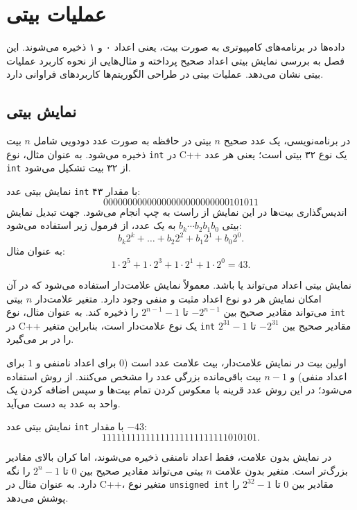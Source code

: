 \chapter{عملیات بیتی}

داده‌ها در برنامه‌های کامپیوتری به صورت بیت، یعنی اعداد ۰ و ۱ ذخیره می‌شوند.
این فصل به بررسی نمایش بیتی اعداد صحیح پرداخته و مثال‌هایی از نحوه کاربرد عملیات بیتی نشان می‌دهد.
عملیات بیتی در طراحی الگوریتم‌ها کاربردهای فراوانی دارد.

\section{نمایش بیتی}


در برنامه‌نویسی، یک عدد صحیح $n$ بیتی در حافظه به صورت عدد دودویی شامل $n$ بیت ذخیره می‌شود.
به عنوان مثال، نوع \texttt{int} در C++ یک نوع ۳۲ بیتی است؛ یعنی هر عدد \texttt{int} از ۳۲ بیت تشکیل می‌شود.

نمایش بیتی عدد \texttt{int} با مقدار ۴۳:
\[00000000000000000000000000101011\]
اندیس‌گذاری بیت‌ها در این نمایش از راست به چپ انجام می‌شود.
جهت تبدیل نمایش بیتی $b_k \cdots b_2 b_1 b_0$ به یک عدد، از فرمول زیر استفاده می‌شود:
\[b_k 2^k + \ldots + b_2 2^2 + b_1 2^1 + b_0 2^0.\]
به عنوان مثال:
\[1 \cdot 2^5 + 1 \cdot 2^3 + 1 \cdot 2^1 + 1 \cdot 2^0 = 43.\]

نمایش بیتی اعداد می‌تواند  یا  باشد.
معمولاً نمایش علامت‌دار استفاده می‌شود که در آن امکان نمایش هر دو نوع اعداد مثبت و منفی وجود دارد.
متغیر علامت‌دار $n$ بیتی می‌تواند مقادیر صحیح بین $-2^{n-1}$ تا $2^{n-1}-1$ را ذخیره کند.
به عنوان مثال، نوع \texttt{int} در C++ یک نوع علامت‌دار است، بنابراین متغیر \texttt{int} مقادیر صحیح بین $-2^{31}$ تا $2^{31}-1$ را در بر می‌گیرد.

اولین بیت در نمایش علامت‌دار، بیت علامت عدد است ($0$ برای اعداد نامنفی و $1$ برای اعداد منفی) و $n-1$ بیت باقی‌مانده بزرگی عدد را مشخص می‌کنند.
از روش  استفاده می‌شود؛ در این روش عدد قرینه با معکوس کردن تمام بیت‌ها و سپس اضافه کردن یک واحد به عدد به دست می‌آید.

نمایش بیتی عدد \texttt{int} با مقدار $-43$:
\[11111111111111111111111111010101.\]

در نمایش بدون علامت، فقط اعداد نامنفی ذخیره می‌شوند، اما کران بالای مقادیر بزرگ‌تر است.
متغیر بدون علامت $n$ بیتی می‌تواند مقادیر صحیح بین $0$ تا $2^n-1$ را نگه دارد.
به عنوان مثال در C++، متغیر نوع \texttt{unsigned int} مقادیر بین $0$ تا $2^{32}-1$ را پوشش می‌دهد.

